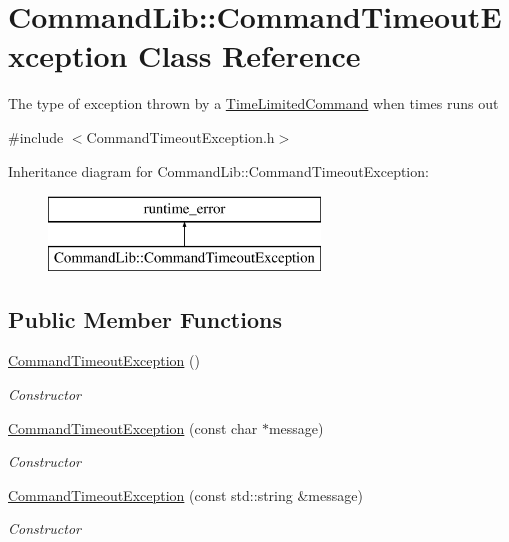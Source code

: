 \hypertarget{class_command_lib_1_1_command_timeout_exception}{}\section{Command\+Lib\+:\+:Command\+Timeout\+Exception Class Reference}
\label{class_command_lib_1_1_command_timeout_exception}


The type of exception thrown by a \mbox{\hyperlink{class_command_lib_1_1_time_limited_command}{Time\+Limited\+Command}} when times runs out 




{\ttfamily \#include $<$Command\+Timeout\+Exception.\+h$>$}

Inheritance diagram for Command\+Lib\+:\+:Command\+Timeout\+Exception\+:\begin{figure}[H]
\begin{center}
\leavevmode
\includegraphics[height=2.000000cm]{class_command_lib_1_1_command_timeout_exception}
\end{center}
\end{figure}
\subsection*{Public Member Functions}
\begin{DoxyCompactItemize}
\item 
\mbox{\hyperlink{class_command_lib_1_1_command_timeout_exception_aad33d69f2a511c9829a3da495aba63e6}{Command\+Timeout\+Exception}} ()
\begin{DoxyCompactList}\small\item\em Constructor\end{DoxyCompactList}\item 
\mbox{\hyperlink{class_command_lib_1_1_command_timeout_exception_a42aa4283bfc20bc9329456f4b75764eb}{Command\+Timeout\+Exception}} (const char $\ast$message)
\begin{DoxyCompactList}\small\item\em Constructor\end{DoxyCompactList}\item 
\mbox{\hyperlink{class_command_lib_1_1_command_timeout_exception_a804d6433419ab58fc046fa2b982f4410}{Command\+Timeout\+Exception}} (const std\+::string \&message)
\begin{DoxyCompactList}\small\item\em Constructor\end{DoxyCompactList}\end{DoxyCompactItemize}


